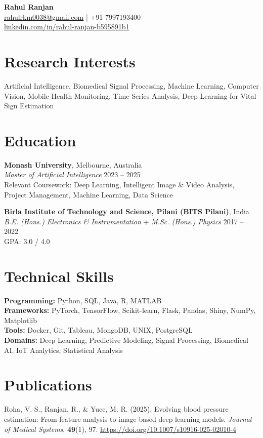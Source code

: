 \documentclass[a4paper,10pt]{article}
\begin{document}
\begin{center}
    {\LARGE \textbf{Rahul Ranjan}} \\
    \href{mailto:rahulrkm0038@gmail.com}{rahulrkm0038@gmail.com} \quad | \quad +91 7997193400 \\
    \href{https://www.linkedin.com/in/rahul-ranjan-b595891b1}{linkedin.com/in/rahul-ranjan-b595891b1}
\end{center}

\section*{Research Interests}
Artificial Intelligence, Biomedical Signal Processing, Machine Learning, Computer Vision, Mobile Health Monitoring, Time Series Analysis, Deep Learning for Vital Sign Estimation

\section*{Education}
\textbf{Monash University}, Melbourne, Australia \\
\textit{Master of Artificial Intelligence} \hfill 2023 -- 2025 \\
Relevant Coursework: Deep Learning, Intelligent Image \& Video Analysis, Project Management, Machine Learning, Data Science

\textbf{Birla Institute of Technology and Science, Pilani (BITS Pilani)}, India \\
\textit{B.E. (Hons.) Electronics \& Instrumentation} + \textit{M.Sc. (Hons.) Physics} \hfill 2017 -- 2022 \\
GPA: 3.0 / 4.0

\section*{Technical Skills}
\textbf{Programming:} Python, SQL, Java, R, MATLAB \\
\textbf{Frameworks:} PyTorch, TensorFlow, Scikit-learn, Flask, Pandas, Shiny, NumPy, Matplotlib \\
\textbf{Tools:} Docker, Git, Tableau, MongoDB, UNIX, PostgreSQL \\
\textbf{Domains:} Deep Learning, Predictive Modeling, Signal Processing, Biomedical AI, IoT Analytics, Statistical Analysis

\section*{Publications}
Roha, V. S., Ranjan, R., \& Yuce, M. R. (2025). Evolving blood pressure estimation: From feature analysis to image-based deep learning models. \textit{Journal of Medical Systems}, \textbf{49}(1), 97. \href{https://doi.org/10.1007/s10916-025-02010-4}{https://doi.org/10.1007/s10916-025-02010-4}
\end{document}
